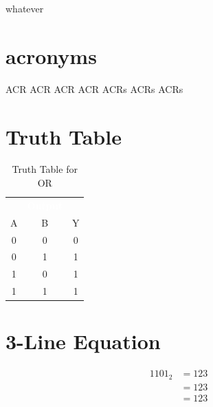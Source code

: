 \begin{lineDisp} %
whatever
\end{lineDisp}



\section{acronyms}
\ac{ACR}   %
\acl{ACR}  %
\acf{ACR}  %
\acs{ACR}  %
\acp{ACR}  %
\acfp{ACR} %
\aclp{ACR} %

\section{Truth Table}
\begin{table}[H]
	\sffamily
	\newcommand{\head}[1]{\textcolor{white}{\textbf{#1}}}		
	\begin{center}
		\begin{tabular}{ccc} 
			\rowcolor{black!75}
			\multicolumn{2}{c}{\head{Inputs}} & \head{Output} \\
			A & B & Y \\
			\hline
			0 & 0 & 0 \\
			0 & 1 & 1 \\
			1 & 0 & 1 \\
			1 & 1 & 1 
		\end{tabular}
	\end{center}
	\caption{Truth Table for OR}
	\label{03:tab:truth_table_for_or}
\end{table}


\section{3-Line Equation}
\begin{align}
	\label{03:eq:identity_example}
	1101_2 &= 123 \\
	\nonumber
	&= 123 \\
	\nonumber
	&= 123
\end{align}


